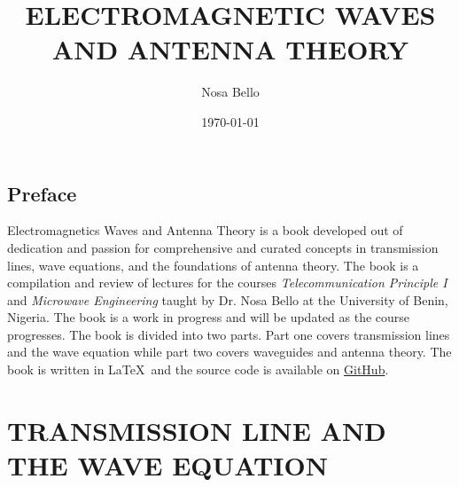 \documentclass[a4paper,10pt, twocolumn]{book}
\begin{document}
\author{Nosa Bello}
\title{\color{blue}ELECTROMAGNETIC WAVES AND ANTENNA THEORY}
\date{\today}

\frontmatter
\maketitle
\tableofcontents

\chapter{Preface}
Electromagnetics Waves and Antenna Theory is a book developed out of dedication and passion for comprehensive and curated concepts in transmission lines, wave equations, and the foundations of antenna theory. The book is a compilation and review of lectures for the courses \textit{Telecommunication Principle I} and \textit{Microwave Engineering} taught by Dr. Nosa Bello at the University of Benin, Nigeria. The book is a work in progress and will be updated as the course progresses. The book is divided into two parts. Part one covers transmission lines and the wave equation while part two covers waveguides and antenna theory. The book is written in \LaTeX\ and the source code is available on \href{https://github.com/allisonoge/electromagnetism-and-antenna-theory-v2.git}{GitHub}.

\mainmatter

\part{TRANSMISSION LINE AND THE WAVE EQUATION}







% 
% 
% 
% 
% 
% 
% 
% 
% 


% 
% 
% 
% 
% 
% 
% 
% 
% 
% 
%  
% 
% 
% 
% 
% 
% 
% 
\end{document}
